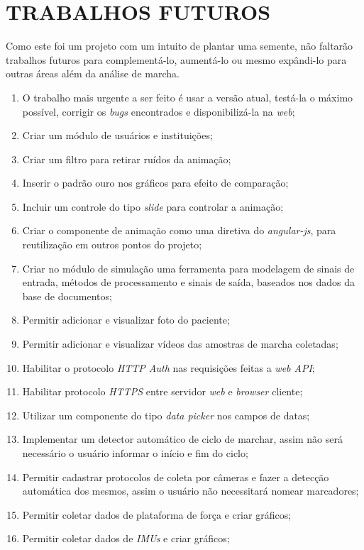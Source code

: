 \chapter[TRABALHOS FUTUROS]{\textbf{TRABALHOS FUTUROS}}
Como este foi um projeto com um intuito de plantar uma semente, não faltarão trabalhos futuros para complementá-lo, aumentá-lo ou mesmo expândi-lo para outras áreas além da análise de marcha.
\begin{enumerate}
	\item O trabalho mais urgente a ser feito é usar a versão atual, testá-la o máximo possível, corrigir os \emph{bugs} encontrados e disponibilizá-la na \emph{web};
	\item Criar um módulo de usuários e instituições;
	\item Criar um filtro para retirar ruídos da animação;
	\item Inserir o padrão ouro nos gráficos para efeito de comparação;
	\item Incluir um controle do tipo \emph{slide} para controlar a animação;
	\item Criar o componente de animação como uma diretiva do \emph{angular-js}, para reutilização em outros pontos do projeto;
	\item Criar no módulo de simulação uma ferramenta para modelagem de sinais de entrada, métodos de processamento e sinais de saída, baseados nos dados da base de documentos;
	\item Permitir adicionar e visualizar foto do paciente;
	\item Permitir adicionar e visualizar vídeos das amostras de marcha coletadas;
	\item Habilitar o protocolo \emph{HTTP Auth} nas requisições feitas a \emph{web API};
	\item Habilitar protocolo \emph{HTTPS} entre servidor \emph{web} e \emph{browser} cliente;
	\item Utilizar um componente do tipo \emph{data picker} nos campos de datas;
	\item Implementar um detector automático de ciclo de marchar, assim não será necessário o usuário informar o início e fim do ciclo;
	\item Permitir cadastrar protocolos de coleta por câmeras e fazer a detecção automática dos mesmos, assim o usuário não necessitará nomear marcadores;
	\item Permitir coletar dados de plataforma de força e criar gráficos;
	\item Permitir coletar dados de \emph{IMUs} e criar gráficos;

\end{enumerate}
